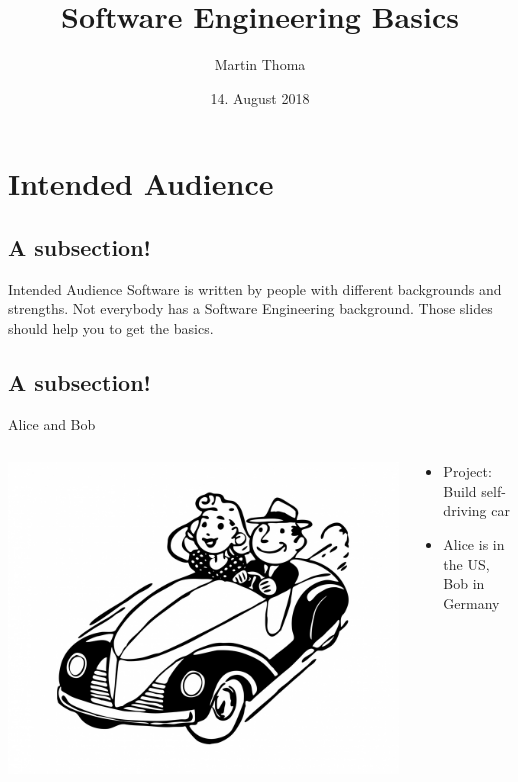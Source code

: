 \documentclass{beamer}
\begin{document}
\title{Software Engineering Basics}
\author{Martin Thoma}
\date{14. August 2018}
\subject{Software Engineering}

\frame{\titlepage}

\section{Intended Audience}
\subsection{A subsection!}
\begin{frame}{Intended Audience}
    Software is written by people with different backgrounds and strengths. Not
    everybody has a Software Engineering background. Those slides should help
    you to get the basics.
\end{frame}

\subsection{A subsection!}
\begin{frame}{Alice and Bob}
    \begin{columns}
        \begin{column}{0.5\textwidth}
             \includegraphics[width=1.0\textwidth]{graphics/car.jpg}
        \end{column}
        \begin{column}{0.5\textwidth}
            \begin{itemize}
                \item Project: Build self-driving car
                \item Alice is in the US, Bob in Germany
            \end{itemize}
        \end{column}
    \end{columns}
\end{frame}
\end{document}
